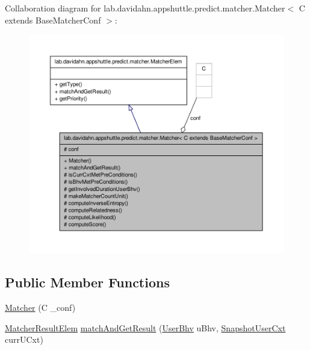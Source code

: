\-Collaboration diagram for lab.\-davidahn.\-appshuttle.\-predict.\-matcher.\-Matcher$<$ \-C extends \-Base\-Matcher\-Conf $>$\-:
\nopagebreak
\begin{figure}[H]
\begin{center}
\leavevmode
\includegraphics[width=350pt]{classlab_1_1davidahn_1_1appshuttle_1_1predict_1_1matcher_1_1_matcher_3_01_c_01extends_01_base_matcher_conf_01_4__coll__graph}
\end{center}
\end{figure}
\subsection*{\-Public \-Member \-Functions}
\begin{DoxyCompactItemize}
\item 
\hyperlink{classlab_1_1davidahn_1_1appshuttle_1_1predict_1_1matcher_1_1_matcher_3_01_c_01extends_01_base_matcher_conf_01_4_a17cba7d88d8eff587d8beb37a2ba38e0}{\-Matcher} (\-C \-\_\-conf)
\item 
\hyperlink{classlab_1_1davidahn_1_1appshuttle_1_1predict_1_1matcher_1_1_matcher_result_elem}{\-Matcher\-Result\-Elem} \hyperlink{classlab_1_1davidahn_1_1appshuttle_1_1predict_1_1matcher_1_1_matcher_3_01_c_01extends_01_base_matcher_conf_01_4_aabf702d7aab4a9f207fc3b859e7ac7ed}{match\-And\-Get\-Result} (\hyperlink{interfacelab_1_1davidahn_1_1appshuttle_1_1collect_1_1bhv_1_1_user_bhv}{\-User\-Bhv} u\-Bhv, \hyperlink{classlab_1_1davidahn_1_1appshuttle_1_1collect_1_1_snapshot_user_cxt}{\-Snapshot\-User\-Cxt} curr\-U\-Cxt)
\end{DoxyCompactItemize}
